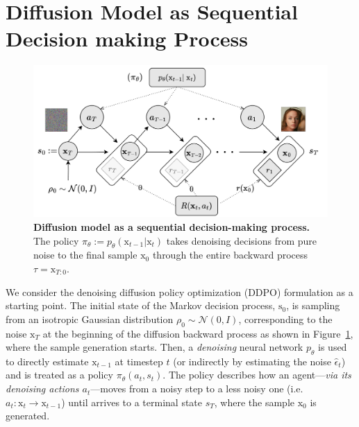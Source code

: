 \section{Diffusion Model as Sequential Decision making Process}\label{sec:diffusion-model-mdp}

\begin{figure}[ht]
  \centering
  \includegraphics[scale=0.85]{img/results/diffusion-model-MDP.png}
  \vspace{-4pt}  %
    \captionsetup{width=\textwidth} %
    \caption{\textbf{Diffusion model as a sequential decision-making process.} The policy $\pi_{\theta}:=p_{\theta}(\mathrm{x}_{t-1} | \mathrm{x}_{t})$  takes denoising decisions from pure noise to the final sample $\mathrm{x}_0$ through the entire backward process $\tau=\mathrm{x}_{T:0}$.}
  \label{fig:diffusion-model-mdp}
\end{figure}

We consider the denoising diffusion policy optimization (DDPO) formulation \citep{black2023training} as a starting point. The initial state of the Markov decision process,
$\mathrm{s}_{0}$, is sampling from an isotropic
Gaussian distribution 
$\rho_{0}\sim\mathcal{N}(0, I)$, corresponding to the
noise $\mathrm{x}_{T}$ at the beginning of the
diffusion backward process as shown in Figure~\ref{fig:diffusion-model-mdp}, where the sample
generation starts. 
Then, a \textit{denoising} neural network $p_{\theta}$
is used to directly estimate $\mathrm{x}_{t-1}$ at
timestep $t$ (or indirectly by
estimating the noise $\hat{\epsilon}_{t}$) and is
treated as a policy $\pi_{\theta}(a_{t}, s_{t})$. The policy describes how an agent---\textit{via its denoising actions $a_{t}$}---moves from a noisy
step to a less noisy one (i.e. 
$a_t: \mathrm{x}_{t} \rightarrow \mathrm{x}_{t-1}$) until arrives to a terminal state $s_T$, where the sample $\mathrm{x}_{0}$ is generated. \\

